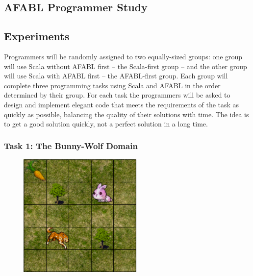 \begin{appendices}


\chapter{AFABL Programmer Study}\label{ch:programmer-study}

\section{Experiments}

Programmers will be randomly assigned to two equally-sized groups: one group will use Scala without AFABL first -- the Scala-first group -- and the other group will use Scala with AFABL first -- the AFABL-first group.  Each group will complete three programming tasks using Scala and AFABL in the order determined by their group.  For each task the programmers will be asked to design and implement elegant code that meets the requirements of the task as quickly as possible, balancing the quality of their solutions with time.  The idea is to get a good solution quickly, not a perfect solution in a long time.

\subsection{Task 1: The Bunny-Wolf Domain}\label{sec:task1}

\begin{figure}[h]

\begin{center}
\includegraphics[height=2.4in]{bunny.png}
\end{center}



\end{figure}
\end{appendices}
